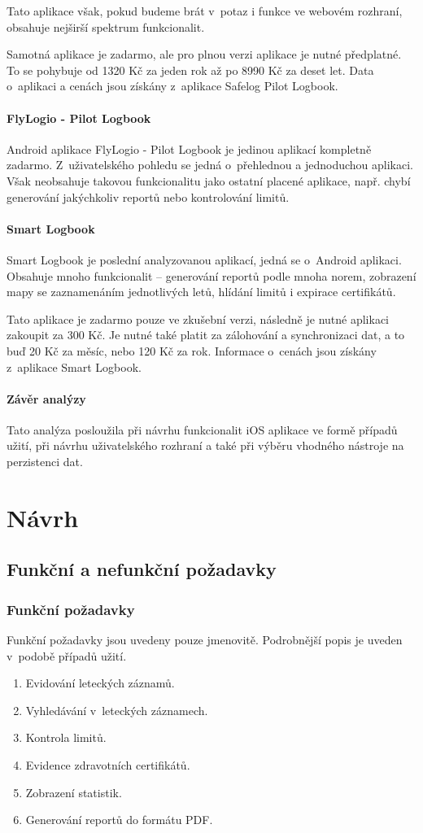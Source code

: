 \documentclass[thesis=M,czech]{FITthesis}[2012/06/26]
\begin{document}
Tato aplikace však, pokud budeme brát v~potaz i funkce ve webovém rozhraní, obsahuje nejširší spektrum funkcionalit.

Samotná aplikace je zadarmo, ale pro plnou verzi aplikace je nutné předplatné. To se pohybuje od 1320 Kč za jeden rok až po 8990 Kč za deset let. Data o~aplikaci a cenách jsou získány z~aplikace Safelog Pilot Logbook.

\subsubsection{FlyLogio - Pilot Logbook}
Android aplikace FlyLogio - Pilot Logbook je jedinou aplikací kompletně zadarmo. Z~uživatelského pohledu se jedná o~přehlednou a jednoduchou aplikaci.  Však neobsahuje takovou funkcionalitu jako ostatní placené aplikace, např. chybí generování jakýchkoliv reportů nebo kontrolování limitů.

\subsubsection{Smart Logbook}
Smart Logbook je poslední analyzovanou aplikací, jedná se o~Android aplikaci. Obsahuje mnoho funkcionalit -- generování reportů podle mnoha norem, zobrazení mapy se zaznamenáním jednotlivých letů, hlídání limitů i expirace certifikátů.

Tato aplikace je zadarmo pouze ve zkušební verzi, následně je nutné aplikaci zakoupit za 300 Kč. Je nutné také platit za zálohování a synchronizaci dat, a to buď 20 Kč za měsíc, nebo 120 Kč za rok. Informace o~cenách jsou získány z~aplikace Smart Logbook.

\subsubsection{Závěr analýzy}
Tato analýza posloužila při návrhu funkcionalit iOS aplikace ve formě případů užití, při návrhu uživatelského rozhraní a také při výběru vhodného nástroje na perzistenci dat.

\chapter{Návrh}

\section{Funkční a nefunkční požadavky}
\subsection{Funkční požadavky}
Funkční požadavky jsou uvedeny pouze jmenovitě. Podrobnější popis je uveden v~podobě případů užití.
\begin{enumerate}
\item Evidování leteckých záznamů.
\item Vyhledávání v~leteckých záznamech.
\item Kontrola limitů.
\item Evidence zdravotních certifikátů.
\item Zobrazení statistik.
\item Generování reportů do formátu PDF.
\end{enumerate}
\end{document}
